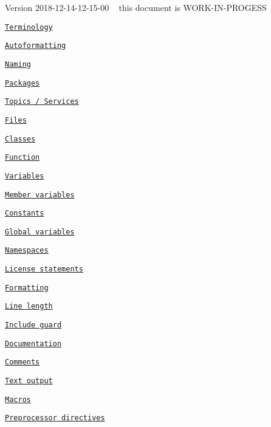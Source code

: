 Version 2018-\/12-\/14-\/12-\/15-\/00 ~\newline
 this document is W\+O\+R\+K-\/\+I\+N-\/\+P\+R\+O\+G\+E\+SS 




\begin{DoxyItemize}
\item \href{#terminology}{\tt Terminology}
\item \href{#autoformatting}{\tt Autoformatting}
\item \href{#naming}{\tt Naming}
\begin{DoxyItemize}
\item \href{#packages}{\tt Packages}
\item \href{#topics--services}{\tt Topics / Services}
\item \href{#files}{\tt Files}
\begin{DoxyItemize}
\item \href{#classes}{\tt Classes}
\item \href{#function}{\tt Function}
\end{DoxyItemize}
\item \href{#variables}{\tt Variables}
\begin{DoxyItemize}
\item \href{#member-variables}{\tt Member variables}
\item \href{#constants}{\tt Constants}
\item \href{#global-variables}{\tt Global variables}
\end{DoxyItemize}
\item \href{#namespaces}{\tt Namespaces}
\end{DoxyItemize}
\item \href{#license-statements}{\tt License statements}
\item \href{#formatting}{\tt Formatting}
\begin{DoxyItemize}
\item \href{#line-length}{\tt Line length}
\end{DoxyItemize}
\item \href{#include-guard}{\tt Include guard}
\item \href{#documentation}{\tt Documentation}
\item \href{#comments}{\tt Comments}
\item \href{#text-output}{\tt Text output}
\item \href{#macros}{\tt Macros}
\item \href{#preprocessor-directives}{\tt Preprocessor directives}

\end{DoxyItemize}
